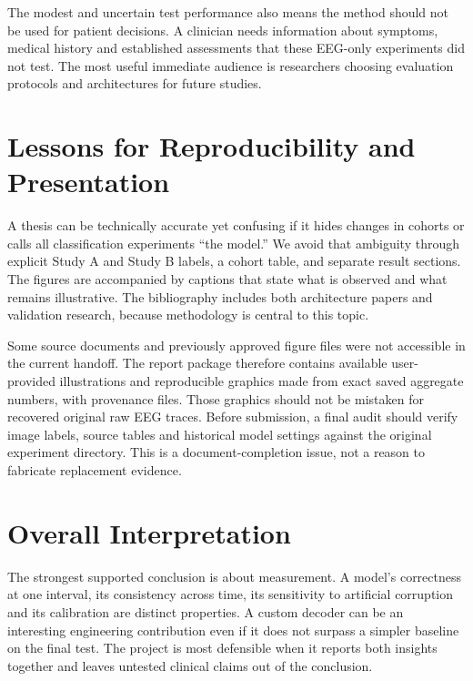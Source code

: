The modest and uncertain test performance also means the method should not be used for patient decisions. A clinician needs information about symptoms, medical history and established assessments that these EEG-only experiments did not test. The most useful immediate audience is researchers choosing evaluation protocols and architectures for future studies.

\section{Lessons for Reproducibility and Presentation}
A thesis can be technically accurate yet confusing if it hides changes in cohorts or calls all classification experiments ``the model.'' We avoid that ambiguity through explicit Study A and Study B labels, a cohort table, and separate result sections. The figures are accompanied by captions that state what is observed and what remains illustrative. The bibliography includes both architecture papers and validation research, because methodology is central to this topic.

Some source documents and previously approved figure files were not accessible in the current handoff. The report package therefore contains available user-provided illustrations and reproducible graphics made from exact saved aggregate numbers, with provenance files. Those graphics should not be mistaken for recovered original raw EEG traces. Before submission, a final audit should verify image labels, source tables and historical model settings against the original experiment directory. This is a document-completion issue, not a reason to fabricate replacement evidence.

\section{Overall Interpretation}
The strongest supported conclusion is about measurement. A model's correctness at one interval, its consistency across time, its sensitivity to artificial corruption and its calibration are distinct properties. A custom decoder can be an interesting engineering contribution even if it does not surpass a simpler baseline on the final test. The project is most defensible when it reports both insights together and leaves untested clinical claims out of the conclusion.
